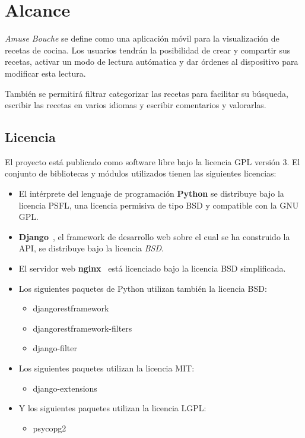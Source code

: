 \section{Alcance}

\textit{Amuse Bouche} se define como una aplicación móvil para la visualización
de recetas de cocina. Los usuarios tendrán la posibilidad de crear y compartir
sus recetas, activar un modo de lectura autómatica y dar órdenes al dispositivo
para modificar esta lectura.

También se permitirá filtrar categorizar las recetas para facilitar su búsqueda,
escribir las recetas en varios idiomas y escribir comentarios y valorarlas.


\subsection{Licencia}
El proyecto está publicado como software libre bajo la licencia
\ac{GPL} versión 3. El conjunto de bibliotecas y módulos utilizados
tienen las siguientes licencias:

\begin{itemize}
\item El intérprete del lenguaje de programación \textbf{Python} se distribuye
  bajo la licencia \ac{PSFL}, una licencia permisiva de tipo \ac{BSD} y
  compatible con la \ac{GNU} \ac{GPL}.

\item \textbf{Django}~\cite{django:mvc}, el framework de desarrollo web sobre el
  cual se ha construido la API, se distribuye bajo la licencia \textit{\ac{BSD}}.

\item El servidor web \textbf{nginx}~\cite{nginx} está licenciado bajo la
  licencia \ac{BSD} simplificada.

\item Los siguientes paquetes de Python utilizan también la licencia \ac{BSD}:
  \begin{itemize}
  \item djangorestframework
  \item djangorestframework-filters
  \item django-filter
  \end{itemize}

\item Los siguientes paquetes utilizan la licencia \ac{MIT}:
  \begin{itemize}
  \item django-extensions
  \end{itemize}

\item Y los siguientes paquetes utilizan la licencia \ac{LGPL}:
  \begin{itemize}
  \item psycopg2
  \end{itemize}

\end{itemize}

